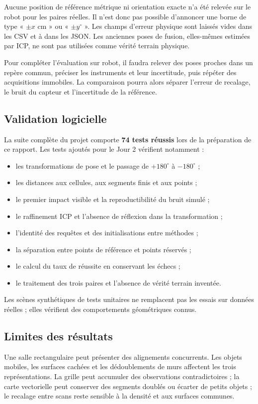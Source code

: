 \documentclass[11pt,a4paper]{article}
\newcommand{\code}[1]{\texttt{\detokenize{#1}}}
\begin{document}
Aucune position de référence métrique ni orientation exacte n'a été relevée
sur le robot pour les paires réelles. Il n'est donc pas possible d'annoncer
une borne de type « $\pm x$ cm » ou « $\pm y^\circ$ ». Les champs d'erreur
physique sont laissés vides dans les CSV et à \code{null} dans les JSON.
Les anciennes poses de fusion, elles-mêmes estimées par ICP, ne sont
pas utilisées comme vérité terrain physique.

Pour compléter l'évaluation sur robot, il faudra relever des poses proches
dans un repère commun, préciser les instruments et leur incertitude, puis
répéter des acquisitions immobiles. La comparaison pourra alors séparer
l'erreur de recalage, le bruit du capteur et l'incertitude de la référence.

\subsection{Validation logicielle}
La suite complète du projet comporte \textbf{74 tests réussis} lors de
la préparation de ce rapport. Les tests ajoutés pour le Jour 2 vérifient
notamment :
\begin{itemize}
\item les transformations de pose et le passage de $+180^\circ$ à $-180^\circ$ ;
\item les distances aux cellules, aux segments finis et aux points ;
\item le premier impact visible et la reproductibilité du bruit simulé ;
\item le raffinement ICP et l'absence de réflexion dans la transformation ;
\item l'identité des requêtes et des initialisations entre méthodes ;
\item la séparation entre points de référence et points réservés ;
\item le calcul du taux de réussite en conservant les échecs ;
\item le traitement des trois paires et l'absence de vérité terrain inventée.
\end{itemize}
Les scènes synthétiques de tests unitaires ne remplacent pas les essais
sur données réelles ; elles vérifient des comportements géométriques connus.

\subsection{Limites des résultats}
Une salle rectangulaire peut présenter des alignements concurrents.
Les objets mobiles, les surfaces cachées et les dédoublements de murs
affectent les trois représentations. La grille peut accumuler des
observations contradictoires ; la carte vectorielle peut conserver des
segments doublés ou écarter de petits objets ; le recalage entre scans
reste sensible à la densité et aux surfaces communes.
\end{document}
